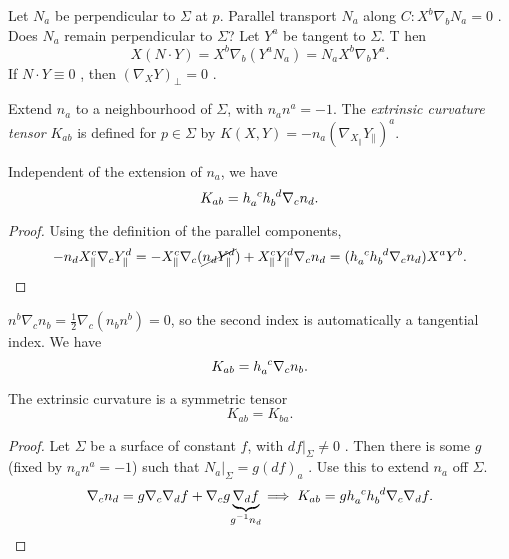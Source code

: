 Let $N_a$  be perpendicular to $\Sigma$  at $p$.
Parallel transport  $N_a$  along $C \colon X^{b} \nabla_{b} N_{a} = 0$ .
Does $N_a$  remain perpendicular to $\Sigma$?
Let $Y^{a}$  be tangent to $\Sigma$. T hen
\begin{equation}
  X(N \cdot Y) = X^{b} \nabla_b (Y^{a} N_a) = N_{a} X^{b} \nabla_b Y^{a}.
\end{equation}
If $N \cdot Y \equiv 0$ , then $(\nabla_X Y)_{\perp} = 0$ .

\begin{definition}
  Extend $n_a$ to a neighbourhood of $\Sigma$, with $n_a n^a = -1$.
  The \emph{extrinsic curvature tensor} $K_{ab}$ is defined for $p \in \Sigma$ by $K(X, Y) = -n_a (\nabla_{X_\parallel} Y_{\parallel})^{a}$.
\end{definition}

\begin{lemma}
  Independent of the extension of $n_a$, we have
  \begin{equation}
    K_{ab} = h\indices{_{a}^{c}} h\indices{_{b}^{d}} \nabla_c n_d.
  \end{equation}
\end{lemma}
\begin{proof}
  Using the definition of the parallel components, 
  \begin{equation}
    -n_d X^{c}_\parallel \nabla_c Y^{d}_\parallel = -X^{c}_\parallel \nabla_c (\cancel{n_d Y_\parallel^d}) + X^{c}_\parallel Y_\parallel^{d} \nabla_c n_d = (h\indices{_{a}^{c}} h\indices{_{b}^{d}} \nabla_c n_d) X^{a} Y^{b}.
  \end{equation}
\end{proof}
\begin{remark}
  $n^{b} \nabla_c n_b = \frac{1}{2} \nabla_c (n_b n^b) = 0$, so the second index is automatically a tangential index.
  We have
  \begin{equation}
    K_{ab} = h\indices{_{a}^{c}} \nabla_c n_b.
  \end{equation}
\end{remark}

\begin{lemma}
  The extrinsic curvature is a symmetric tensor
  \begin{equation}
    K_{ab} = K_{ba}.
  \end{equation}
\end{lemma}
\begin{proof}
  Let $\Sigma$  be a surface of constant $f$, with $df\rvert_\Sigma \neq 0$ .
  Then there is some $g$ (fixed by $n_a n^a = -1$) such that $N_a \rvert_{\Sigma} = g(df)_a$ .
  Use this to extend $n_a$  off $\Sigma$.
   \begin{equation}
    \nabla_c n_d = g \nabla_c \nabla_d f + \nabla_c g \underbrace{\nabla_d f}_{\mathclap{g^{-1} n_d}} \implies K_{ab} = g h\indices{_{a}^{c}} h\indices{_{b}^{d}} \nabla_c \nabla_d f.
  \end{equation}
\end{proof}

